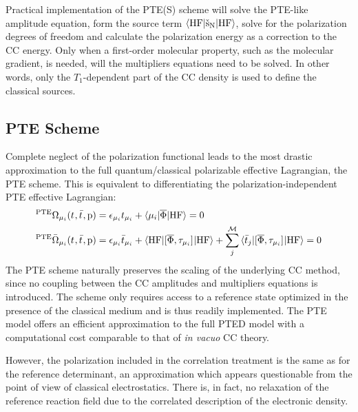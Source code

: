 Practical implementation of the \acrshort{PTE(S)} scheme will solve the
\acrshort{PTE}-like amplitude equation, form the source term
$\braket{\mathrm{HF} | \check{\mathrm{s}}_\mathrm{N} | \mathrm{HF}}$, solve for
the polarization degrees of freedom and calculate the polarization
energy as a correction to the \acrshort{CC} energy.
Only when a first-order molecular property, such as the molecular
gradient, is needed, will the multipliers equations need to be solved.
In other words, only the $T_1$-dependent part of the \acrshort{CC} density is
used to define the classical sources.

\subsection*{PTE Scheme}

Complete neglect of the polarization functional leads to the most
drastic approximation to the full quantum/classical polarizable
effective Lagrangian, the \acrshort{PTE} scheme.
This is equivalent to differentiating the polarization-independent
\acrshort{PTE} effective Lagrangian:
\begin{subequations}
  \begin{align}
 {}^{\mathrm{PTE}}\Omega_{\mu_i}(t_{}, \bar{t}_{}, \mathrm{p})  &=
   \epsilon_{\mu_i}t_{\mu_i} + \braket{\mu_i | \overline{\Phi} | \mathrm{HF}}
    = 0 \\
   {}^{\mathrm{PTE}}\bar{\Omega}_{\mu_i}(t_{}, \bar{t}_{}, \mathrm{p})
    &=
    \epsilon_{\mu_i}\bar{t}_{\mu_i} +
    \braket{\mathrm{HF} | [ \overline{\Phi}, \tau_{\mu_i} ]^{} | \mathrm{HF}} +
    \sum_{j}^{\mathcal{M}}\braket{\bar{t}_{j} |
    [ \overline{\Phi}, \tau_{\mu_i} ]^{} | \mathrm{HF}}
    = 0
  \end{align}
\end{subequations}
The \acrshort{PTE} scheme naturally preserves the scaling of the underlying
\acrshort{CC} method, since no coupling between the \acrshort{CC} amplitudes and
multipliers equations is introduced.
The scheme only requires access to a
reference state optimized in the presence of the classical medium and is
thus readily implemented.
The \acrshort{PTE} model offers an efficient approximation to the full
\acrshort{PTED} model with a computational cost comparable to that of
\emph{in vacuo} \acrshort{CC} theory.

However, the polarization included in the correlation treatment is the
same as for the reference determinant, an approximation which appears
questionable from the point of view of classical electrostatics. There
is, in fact, no relaxation of the reference reaction field due to the
correlated description of the electronic density.

